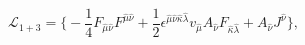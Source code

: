 \begin{equation}
\mathcal{L}_{1+3}=\biggl\{-\frac{1}{4}F_{\hat{\mu}\hat{\nu}}F^{\hat{\mu}%
\hat{\nu}}+\frac{1}{2}\epsilon^{\hat{\mu}\hat{\nu}\hat{\kappa}\hat{\lambda}%
}v_{\hat{\mu}}A_{\hat{\nu}}F_{\hat{\kappa}\hat{\lambda}}+A_{\hat{\nu}}%
J^{\hat{\nu}}\biggr\}, \label{action1}%
\end{equation}

